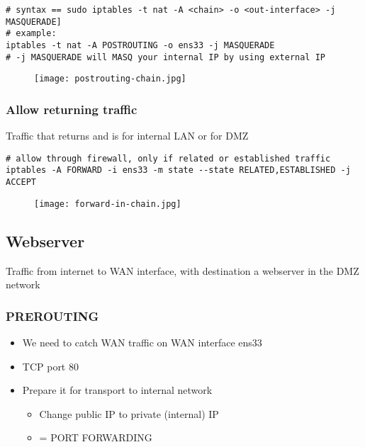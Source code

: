 \documentclass{article}
\begin{document}
\begin{verbatim}
# syntax == sudo iptables -t nat -A <chain> -o <out-interface> -j MASQUERADE]
# example:
iptables -t nat -A POSTROUTING -o ens33 -j MASQUERADE
# -j MASQUERADE will MASQ your internal IP by using external IP
\end{verbatim}

\begin{figure}[H]
    \centering
    \texttt{[image: postrouting-chain.jpg]}
\end{figure}

\subsubsection{Allow returning traffic}

Traffic that returns and is for internal LAN or for DMZ

\begin{verbatim}
# allow through firewall, only if related or established traffic
iptables -A FORWARD -i ens33 -m state --state RELATED,ESTABLISHED -j ACCEPT
\end{verbatim}

\begin{figure}[H]
    \centering
    \texttt{[image: forward-in-chain.jpg]}
\end{figure}

\subsection{Webserver}

Traffic from internet to WAN interface, with destination a webserver in the DMZ network

\subsubsection{PREROUTING}

\begin{itemize}
    \item We need to catch WAN traffic on WAN interface ens33
    \item TCP port 80
    \item Prepare it for transport to internal network
    \begin{itemize}
        \item Change public IP to private (internal) IP
        \item = PORT FORWARDING
    \end{itemize}
\end{itemize}
\end{document}
